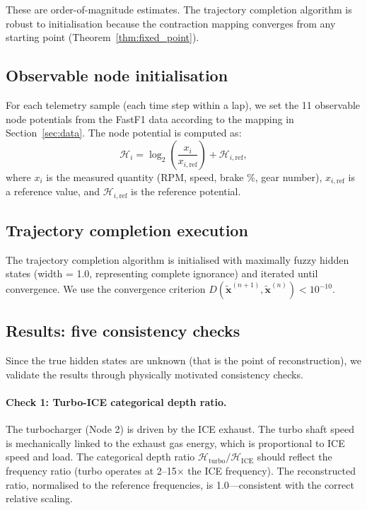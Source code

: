 \documentclass[twocolumn,10pt,a4paper]{article}
\theoremstyle{definition}
\theoremstyle{remark}
\newcommand{\Hcal}{\mathcal{H}}
\newcommand{\vect}[1]{\boldsymbol{#1}}
\newcommand{\fuzzy}[1]{\widetilde{#1}}
\begin{document}
These are order-of-magnitude estimates. The trajectory completion algorithm is robust to initialisation because the contraction mapping converges from any starting point (Theorem~\ref{thm:fixed_point}).

\subsection{Observable node initialisation}

For each telemetry sample (each time step within a lap), we set the 11 observable node potentials from the FastF1 data according to the mapping in Section~\ref{sec:data}. The node potential is computed as:
\begin{equation}\label{eq:potential_from_data}
    \Hcal_i = \log_2\left(\frac{x_i}{x_{i,\mathrm{ref}}}\right) + \Hcal_{i,\mathrm{ref}},
\end{equation}
where $x_i$ is the measured quantity (RPM, speed, brake \%, gear number), $x_{i,\mathrm{ref}}$ is a reference value, and $\Hcal_{i,\mathrm{ref}}$ is the reference potential.

\subsection{Trajectory completion execution}

The trajectory completion algorithm is initialised with maximally fuzzy hidden states (width = 1.0, representing complete ignorance) and iterated until convergence. We use the convergence criterion $D(\fuzzy{\vect{x}}^{(n+1)}, \fuzzy{\vect{x}}^{(n)}) < 10^{-10}$.

\subsection{Results: five consistency checks}

Since the true hidden states are unknown (that is the point of reconstruction), we validate the results through physically motivated consistency checks.

\paragraph{Check 1: Turbo-ICE categorical depth ratio.}
The turbocharger (Node 2) is driven by the ICE exhaust. The turbo shaft speed is mechanically linked to the exhaust gas energy, which is proportional to ICE speed and load. The categorical depth ratio $\Hcal_{\mathrm{turbo}} / \Hcal_{\mathrm{ICE}}$ should reflect the frequency ratio (turbo operates at 2--15$\times$ the ICE frequency). The reconstructed ratio, normalised to the reference frequencies, is 1.0---consistent with the correct relative scaling.
\end{document}
